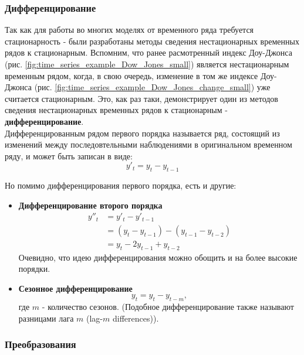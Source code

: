 \subsubsection{Дифференцирование}

Так как для работы во многих моделях от временного ряда требуется стационарность - 
были разработаны методы сведения нестационарных временных рядов к стационарным. 
Вспомним, что ранее расмотренный индекс Доу-Джонса (рис. \ref{fig:time_series_example_Dow_Jones_small}) 
является нестационарным временным рядом, когда, в свою очередь, 
изменение в том же индексе Доу-Джонса (рис. \ref{fig:time_series_example_Dow_Jones_change_small}) 
уже считается стационарным. Это, как раз таки, демонстрирует 
один из методов сведения нестационарных временных рядов к стационарным - 
\textbf{дифференцирование}. \\

Дифференцированным рядом первого порядка называется ряд, состоящий из 
изменений между последовтельными 
наблюдениями в оригинальном временном ряду, и может быть записан в виде:
\begin{equation*}
    y'_t = y_t - y_{t-1}
\end{equation*} 

Но помимо дифференцирования первого порядка, есть и другие:
\begin{itemize}
    \item \textbf{Дифференцирование второго порядка}
    \begin{align*}
        y''_t &= y'_t - y'_{t-1}  \\
        &= (y_t - y_{t-1}) - (y_{t-1} - y_{t-2})  \\
        &= y_t - 2 y_{t-1} + y_{t-2}
    \end{align*}
    Очевидно, что идею дифференцирования можно обощить и на более 
    высокие порядки.
    \item \textbf{Сезонное дифференцирование}
    \begin{equation*}
        y_t = y_t - y_{t-m},
    \end{equation*}
    где $m$ - количество сезонов. (Подобное дифференцирование также называют 
    \guillemotleft разницами лага $m$\guillemotright {} (lag-$m$ differences)).
\end{itemize} 

\subsubsection{Преобразования}

